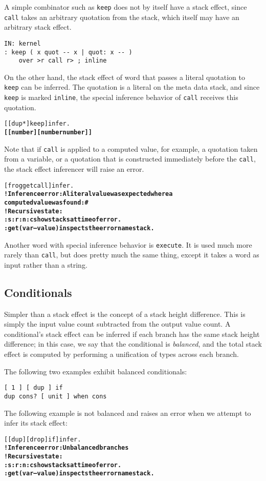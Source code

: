 \documentclass{book}
\begin{document}
A simple combinator such as \verb|keep| does not by itself have a stack effect, since \verb|call| takes an arbitrary quotation from the stack, which itself may have an arbitrary stack effect.
\begin{verbatim}
IN: kernel
: keep ( x quot -- x | quot: x -- )
    over >r call r> ; inline
\end{verbatim}
On the other hand, the stack effect of word that passes a literal quotation to \verb|keep| can be inferred. The quotation is a literal on the meta data stack, and since \verb|keep| is marked \verb|inline|, the special inference behavior of \verb|call| receives this quotation.
\begin{alltt}
  [ [ dup * ] keep ] infer .
\textbf{[ [ number ] [ number number ] ]}
\end{alltt}
Note that if \verb|call| is applied to a computed value, for example, a quotation taken from a variable, or a quotation that is constructed immediately before the \verb|call|, the stack effect inferencer will raise an error.
\begin{alltt}
  [ frog get call ] infer .
\textbf{! Inference error: A literal value was expected where a
computed value was found: \#<computed @ 716167923>
! Recursive state:
:s :r :n :c show stacks at time of error.
:get ( var -- value ) inspects the error namestack.}
\end{alltt}
Another word with special inference behavior is \verb|execute|. It is used much more rarely than \verb|call|, but does pretty much the same thing, except it takes a word as input rather than a string.

\subsection{Conditionals}

Simpler than a stack effect is the concept of a stack height difference. This is simply the input value count subtracted from the output value count. A conditional's stack effect can be inferred if each branch has the same stack height difference; in this case, we say that the conditional is \emph{balanced}, and the total stack effect is computed by performing a unification of types across each branch.

The following two examples exhibit balanced conditionals:
\begin{verbatim}
[ 1 ] [ dup ] if
dup cons? [ unit ] when cons
\end{verbatim}
The following example is not balanced and raises an error when we attempt to infer its stack effect:
\begin{alltt}
  [ [ dup ] [ drop ] if ] infer .
\textbf{! Inference error: Unbalanced branches
! Recursive state:
:s :r :n :c show stacks at time of error.
:get ( var -- value ) inspects the error namestack.}
\end{alltt}
\end{document}
